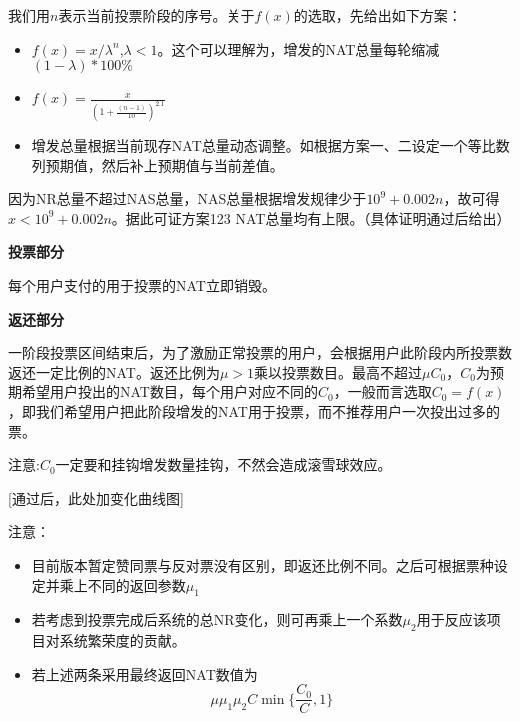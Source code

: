 我们用$n$表示当前投票阶段的序号。关于$f(x)$的选取，先给出如下方案：
\begin{itemize}
	\item $f(x)=x/\lambda^n$,$\lambda<1$。这个可以理解为，增发的NAT总量每轮缩减$(1-\lambda)*100\%$
	\item $f(x)=\frac{x}{(1+\frac{(n-1)}{10})^{2.1}}$
	\item 增发总量根据当前现存NAT总量动态调整。如根据方案一、二设定一个等比数列预期值，然后补上预期值与当前差值。
\end{itemize}
因为NR总量不超过NAS总量，NAS总量根据增发规律少于$10^9+0.002n$，故可得$x<10^9+0.002n$。据此可证方案123 NAT总量均有上限。（具体证明通过后给出）

\textbf{投票部分}

每个用户支付的用于投票的NAT立即销毁。

\textbf{返还部分}

一阶段投票区间结束后，为了激励正常投票的用户，会根据用户此阶段内所投票数返还一定比例的NAT。返还比例为$\mu>1$乘以投票数目。最高不超过$\mu C_0$，$C_0$为预期希望用户投出的NAT数目，每个用户对应不同的$C_0$，一般而言选取$C_0=f(x)$，即我们希望用户把此阶段增发的NAT用于投票，而不推荐用户一次投出过多的票。

注意:$C_0$一定要和挂钩增发数量挂钩，不然会造成滚雪球效应。	

\begin{comment}
具体数额为
$$\mu C \min \{\frac{C_0}{C},1\}$$
其中$\mu>1$为激励系数，可选取$\mu=1.1$。$C$为用户此阶段（一个增发周期内）投票花费（即烧毁的）NAT总数目，$C_0$为预期希望用户投出的NAT数目，每个用户对应不同的$C_0$，一般而言选取$C_0=\lambda f(x_1)$，即我们希望用户把此阶段增发的NAT用于投票，而不推荐用户一次投出过多的票。

对于用户而言，假设他一个阶段内用$C$枚NAT进行投票且$C \leq C_0$，则其NAT的变化量为
$$\mu C \min \{\frac{C_0}{C},1\}-C = \mu C_0-C$$
上式随$C$递减。这意味着对于一个利益最大化的用户而言他的最优策略为投出$C_0$票。如若项目对其意义重大，需要投出大量NAT，则有可能$\mu C_0-C <0$，相当于该用户要“动老本”进行投票。

若$C < C_0$，则其NAT的变化量为

$$\mu C \min \{\frac{C_0}{C},1\}-C = (\mu-1)C$$
上式随$C$递增，这意味着最优策略同样是投出$C_0$票。当投票数目较少时仍能获得收益但相对投$C_0$而言较少。

\end{comment}
[通过后，此处加变化曲线图]

注意：
\begin{itemize}
\item 目前版本暂定赞同票与反对票没有区别，即返还比例不同。之后可根据票种设定并乘上不同的返回参数$\mu_1$
\item 若考虑到投票完成后系统的总NR变化，则可再乘上一个系数$\mu_2$用于反应该项目对系统繁荣度的贡献。
\item 若上述两条采用最终返回NAT数值为
$$ \mu\mu_1\mu_2 C \min \{\frac{C_0}{C},1\}$$


\end{itemize}

